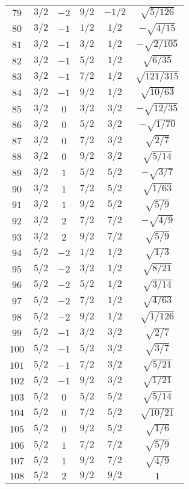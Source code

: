 \begin{table}
\begin{center}
\begin{tabular}{|c|c|c|c|c|c|}
$79$ & $3/2$ & $-2$ & $9/2$ & $-1/2$ & $\sqrt{5/126}$ \\ 
$80$ & $3/2$ & $-1$ & $1/2$ & $1/2$ & $-\sqrt{4/15}$ \\ 
$81$ & $3/2$ & $-1$ & $3/2$ & $1/2$ & $-\sqrt{2/105}$ \\ 
$82$ & $3/2$ & $-1$ & $5/2$ & $1/2$ & $\sqrt{6/35}$ \\ 
$83$ & $3/2$ & $-1$ & $7/2$ & $1/2$ & $\sqrt{121/315}$ \\ 
$84$ & $3/2$ & $-1$ & $9/2$ & $1/2$ & $\sqrt{10/63}$ \\ 
$85$ & $3/2$ & $0$ & $3/2$ & $3/2$ & $-\sqrt{12/35}$ \\ 
$86$ & $3/2$ & $0$ & $5/2$ & $3/2$ & $-\sqrt{1/70}$ \\ 
$87$ & $3/2$ & $0$ & $7/2$ & $3/2$ & $\sqrt{2/7}$ \\ 
$88$ & $3/2$ & $0$ & $9/2$ & $3/2$ & $\sqrt{5/14}$ \\ 
$89$ & $3/2$ & $1$ & $5/2$ & $5/2$ & $-\sqrt{3/7}$ \\ 
$90$ & $3/2$ & $1$ & $7/2$ & $5/2$ & $\sqrt{1/63}$ \\ 
$91$ & $3/2$ & $1$ & $9/2$ & $5/2$ & $\sqrt{5/9}$ \\ 
$92$ & $3/2$ & $2$ & $7/2$ & $7/2$ & $-\sqrt{4/9}$ \\ 
$93$ & $3/2$ & $2$ & $9/2$ & $7/2$ & $\sqrt{5/9}$ \\ 
$94$ & $5/2$ & $-2$ & $1/2$ & $1/2$ & $\sqrt{1/3}$ \\ 
$95$ & $5/2$ & $-2$ & $3/2$ & $1/2$ & $\sqrt{8/21}$ \\ 
$96$ & $5/2$ & $-2$ & $5/2$ & $1/2$ & $\sqrt{3/14}$ \\ 
$97$ & $5/2$ & $-2$ & $7/2$ & $1/2$ & $\sqrt{4/63}$ \\ 
$98$ & $5/2$ & $-2$ & $9/2$ & $1/2$ & $\sqrt{1/126}$ \\ 
$99$ & $5/2$ & $-1$ & $3/2$ & $3/2$ & $\sqrt{2/7}$ \\ 
$100$ & $5/2$ & $-1$ & $5/2$ & $3/2$ & $\sqrt{3/7}$ \\ 
$101$ & $5/2$ & $-1$ & $7/2$ & $3/2$ & $\sqrt{5/21}$ \\ 
$102$ & $5/2$ & $-1$ & $9/2$ & $3/2$ & $\sqrt{1/21}$ \\ 
$103$ & $5/2$ & $0$ & $5/2$ & $5/2$ & $\sqrt{5/14}$ \\ 
$104$ & $5/2$ & $0$ & $7/2$ & $5/2$ & $\sqrt{10/21}$ \\ 
$105$ & $5/2$ & $0$ & $9/2$ & $5/2$ & $\sqrt{1/6}$ \\ 
$106$ & $5/2$ & $1$ & $7/2$ & $7/2$ & $\sqrt{5/9}$ \\ 
$107$ & $5/2$ & $1$ & $9/2$ & $7/2$ & $\sqrt{4/9}$ \\ 
$108$ & $5/2$ & $2$ & $9/2$ & $9/2$ & $1$ \\ 
\hline 
\end{tabular}
\end{center}
\end{table}

